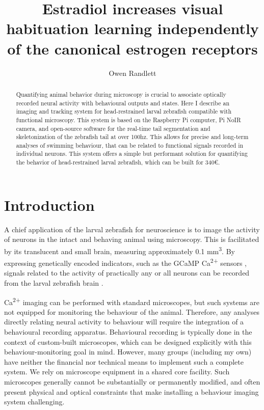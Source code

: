 \documentclass[9pt,lineno]{RandlettLab_elife}
\title{Estradiol increases visual habituation learning independently of the canonical estrogen receptors}
\author[1]{Owen Randlett}
\affil[1]{
Laboratoire MeLiS, UCBL - CNRS UMR5284 - Inserm U1314, Institut NeuroMyoGène, Faculté de Médecine et de Pharmacie, 8 avenue Rockefeller, 69008, Lyon, France 
}
\begin{document}
\maketitle
\begin{abstract}

Quantifying animal behavior during microscopy is crucial to associate optically recorded neural activity with behavioural outputs and states. Here I describe an imaging and tracking system for head-restrained larval zebrafish compatible with functional microscopy. This system is based on the Raspberry Pi computer, Pi NoIR camera, and open-source software for the real-time tail segmentation and skeletonization of the zebrafish tail at over 100hz. This allows for precise and long-term analyses of swimming behaviour, that can be related to functional signals recorded in individual neurons. This system offers a simple but performant solution for quantifying the behavior of head-restrained larval zebrafish, which can be built for 340€.

\end{abstract}

\section{Introduction}

A chief application of the larval zebrafish for neuroscience is to image the activity of neurons in the intact and behaving animal using microscopy. This is facilitated by its translucent and small brain, measuring approximately 0.1 mm\textsuperscript{3}. By expressing genetically encoded indicators, such as the GCaMP Ca\textsuperscript{2+} sensors \citep{Akerboom2012, Chen2013}, signals related to the activity of practically any or all neurons can be recorded from the larval zebrafish brain \citep{Ahrens2012, Portugues2014}. 

Ca\textsuperscript{2+} imaging can be performed with standard microscopes, but such systems are not equipped for monitoring the behaviour of the animal. Therefore, any analyses directly relating neural activity to behaviour will require the integration of a behavioural recording apparatus. Behavioural recording is typically done in the context of custom-built microscopes, which can be designed explicitly with this behaviour-monitoring goal in mind. However, many groups (including my own) have neither the financial nor technical means to implement such a complete system. We rely on microscope equipment in a shared core facility. Such microscopes generally cannot be substantially or permanently modified, and often present physical and optical constraints that make installing a behaviour imaging system challenging. 
\end{document}
